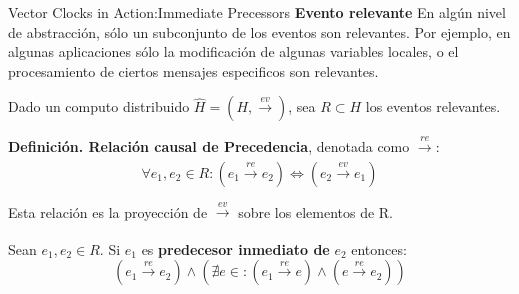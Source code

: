 \begin{frame}[fragile]{Vector Clocks in Action:}{Immediate Precessors}
    \justifying
    \textbf{Evento relevante} En algún nivel de abstracción, sólo un subconjunto de los eventos son relevantes. Por ejemplo, en algunas aplicaciones sólo la modificación de algunas variables locales, o el procesamiento de ciertos mensajes especificos son relevantes.
    
    Dado un computo distribuido
    $\widehat{H}=(H,\xrightarrow[]{ev})$, sea $R\subset H$ los eventos relevantes.

    \textbf{Definición. Relación causal de Precedencia}, denotada como $\xrightarrow[]{re}$:
    $$\forall e_1,e_2 \in R : (e_1 \xrightarrow[]{re} e_2) \iff (e_2 \xrightarrow[]{ev} e_1)$$

    Esta relación es la proyección de $\xrightarrow[]{ev}$ sobre los elementos de R.
    

    Sean $e_1,e_2 \in R$. Si $e_1$ es \textbf{predecesor inmediato de} $e_2$ entonces:
    $$(e_1 \xrightarrow[]{re} e_2) \wedge (\nexists e \in : (e_1 \xrightarrow[]{re} e) \wedge (e \xrightarrow[]{re}e_2))$$

\end{frame}